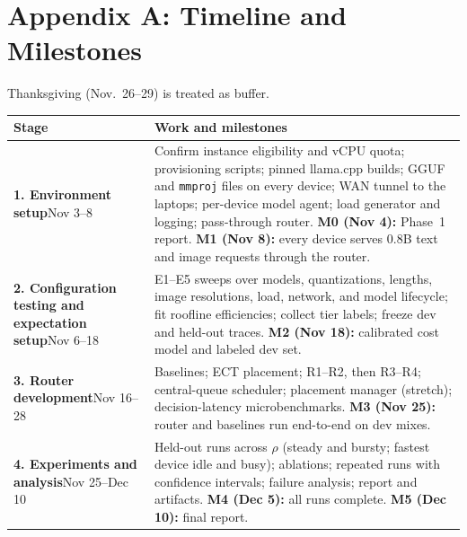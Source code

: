 \onecolumn
\raggedbottom
\setlength{\intextsep}{8pt plus 2pt minus 2pt}
\small

\section*{Appendix A: Timeline and Milestones}
Thanksgiving (Nov.~26--29) is treated as buffer.

\begin{center}
\begin{tabularx}{\textwidth}{@{}>{\raggedright\arraybackslash}p{1.6in}>{\raggedright\arraybackslash}X@{}}
\toprule
Stage & Work and milestones \\
\midrule
\textbf{1. Environment setup}\newline Nov 3--8 &
Confirm instance eligibility and vCPU quota; provisioning scripts; pinned
llama.cpp builds; GGUF and \texttt{mmproj} files on every device; WAN tunnel to
the laptops; per-device model agent; load generator and logging; pass-through
router. \textbf{M0 (Nov 4):} Phase~1 report. \textbf{M1 (Nov 8):} every device
serves 0.8B text and image requests through the router. \\
\addlinespace[3pt]
\textbf{2. Configuration testing and expectation setup}\newline Nov 6--18 &
E1--E5 sweeps over models, quantizations, lengths, image resolutions, load,
network, and model lifecycle; fit roofline efficiencies; collect tier labels;
freeze dev and held-out traces. \textbf{M2 (Nov 18):} calibrated cost model and
labeled dev set. \\
\addlinespace[3pt]
\textbf{3. Router development}\newline Nov 16--28 &
Baselines; ECT placement; R1--R2, then R3--R4; central-queue scheduler;
placement manager (stretch); decision-latency microbenchmarks.
\textbf{M3 (Nov 25):} router and baselines run end-to-end on dev mixes. \\
\addlinespace[3pt]
\textbf{4. Experiments and analysis}\newline Nov 25--Dec 10 &
Held-out runs across $\rho$ (steady and bursty; fastest device idle and busy);
ablations; repeated runs with confidence intervals; failure analysis; report
and artifacts. \textbf{M4 (Dec 5):} all runs complete. \textbf{M5 (Dec 10):}
final report. \\
\bottomrule
\end{tabularx}
\end{center}

